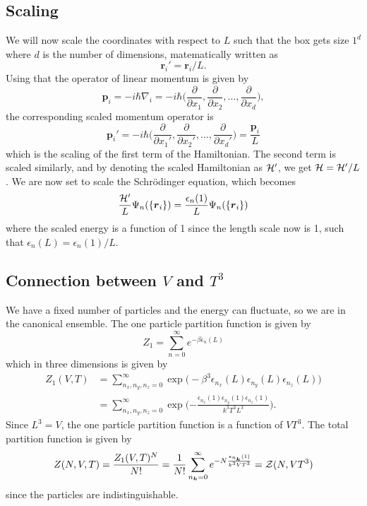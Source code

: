 \documentclass[norsk,a4paper,12pt]{article}
\begin{document}
\subsection{Scaling}
We will now scale the coordinates with respect to $L$ such that the box gets size $1^d$ where $d$ is the number of dimensions, matematically written as
\begin{equation}
\boldsymbol{r}_i'=\boldsymbol{r}_i/L.
\end{equation}
Using that the operator of linear momentum is given by 
\begin{equation}
\boldsymbol{p}_i=-i\hbar\nabla_i=-i\hbar\Big(\frac{\partial}{\partial x_1},\frac{\partial}{\partial x_2},\hdots,\frac{\partial}{\partial x_d}\Big),
\end{equation}
the corresponding scaled momentum operator is 
\begin{equation}
\boldsymbol{p}_i'=-i\hbar\Big(\frac{\partial}{\partial x_1'},\frac{\partial}{\partial x_2'},\hdots,\frac{\partial}{\partial x_d'}\Big)= \frac{\boldsymbol{p}_i}{L}
\end{equation}
which is the scaling of the first term of the Hamiltonian. The second term is scaled similarly, and by denoting the scaled Hamiltonian as ${\cal H}'$, we get ${\cal H}={\cal H}'/L$. We are now set to scale the Schrödinger equation, which becomes
\begin{equation}
\frac{{\cal H}'}{L}\Psi_n(\{\boldsymbol{r}_i\})=\frac{\epsilon_n(1)}{L}\Psi_n(\{\boldsymbol{r}_i\})
\end{equation}
where the scaled energy is a function of 1 since the length scale now is 1, such that $\epsilon_n(L)=\epsilon_n(1)/L$.

\subsection{Connection between $V$ and $T^3$}
We have a fixed number of particles and the energy can fluctuate, so we are in the canonical ensemble. The one particle partition function is given by
\begin{equation}
Z_1=\sum_{n=0}^{\infty}e^{-\beta\epsilon_n(L)}
\end{equation}
which in three dimensions is given by
\begin{align}
Z_1(V,T)&=\sum_{n_x,n_y,n_z=0}^{\infty}\exp{\big(-\beta^3\epsilon_{n_x}(L)\epsilon_{n_y}(L)\epsilon_{n_z}(L)}\big)\\
&=\sum_{n_x,n_y,n_z=0}^{\infty}\exp\Big({-\frac{\epsilon_{n_x}(1)\epsilon_{n_y}(1)\epsilon_{n_z}(1)}{k^3T^3L^3}}\Big).
\end{align}
Since $L^3=V$, the one particle partition function is a function of $VT^3$. The total partition function is given by 
\begin{equation}
Z(N,V,T)=\frac{Z_1(V,T)^N}{N!}=\frac{1}{N!}\sum_{n_{\boldsymbol{k}}=0}^{\infty}e^{-N\frac{\epsilon_{n_{\boldsymbol{k}}}(1)}{k^3VT^3}}={\cal Z}(N,VT^3)
\end{equation}
since the particles are indistinguishable.
\end{document}

